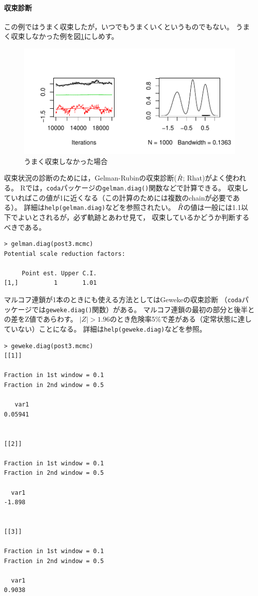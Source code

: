 \documentclass[11pt,uplatex]{jsarticle}
\begin{document}
\paragraph{収束診断}
この例ではうまく収束したが，いつでもうまくいくというものでもない。
うまく収束しなかった例を図\ref{bad_mcmc}にしめす。
\begin{figure}[htbp]
	\begin{center}
		\includegraphics[bb=0 0 420 210, clip, width=320 bp]{bad_mcmc.pdf}
	\end{center}
	\caption{うまく収束しなかった場合}
	\label{bad_mcmc}
\end{figure}

収束状況の診断のためには，Gelman-Rubinの収束診断($\Hat{R}$; Rhat)がよく使われる。
\textsf{R}では，\texttt{coda}パッケージの\texttt{gelman.diag()}関数などで計算できる。
収束していればこの値が1に近くなる（この計算のためには複数のchainが必要である）。
詳細は\texttt{help(gelman.diag)}などを参照されたい。
$\Hat{R}$の値は一般には1.1以下でよいとされるが，必ず軌跡とあわせ見て，
収束しているかどうか判断するべきである。


\pagebreak
\begin{lstlisting}
> gelman.diag(post3.mcmc)
Potential scale reduction factors:

     Point est. Upper C.I.
[1,]          1       1.01

\end{lstlisting}

\vspace{1zw}

マルコフ連鎖が1本のときにも使える方法としてはGewekeの収束診断
（\texttt{coda}パッケージでは\texttt{geweke.diag()}関数）がある。
マルコフ連鎖の最初の部分と後半との差をZ値であらわす。
$|Z|>1.96$のとき危険率5\%で差がある（定常状態に達していない）ことになる。
詳細は\texttt{help(geweke.diag)}などを参照。
\begin{lstlisting}
> geweke.diag(post3.mcmc)
[[1]]

Fraction in 1st window = 0.1
Fraction in 2nd window = 0.5 

   var1 
0.05941 


[[2]]

Fraction in 1st window = 0.1
Fraction in 2nd window = 0.5 

  var1 
-1.898 


[[3]]

Fraction in 1st window = 0.1
Fraction in 2nd window = 0.5 

  var1 
0.9038 


\end{lstlisting}
\end{document}

